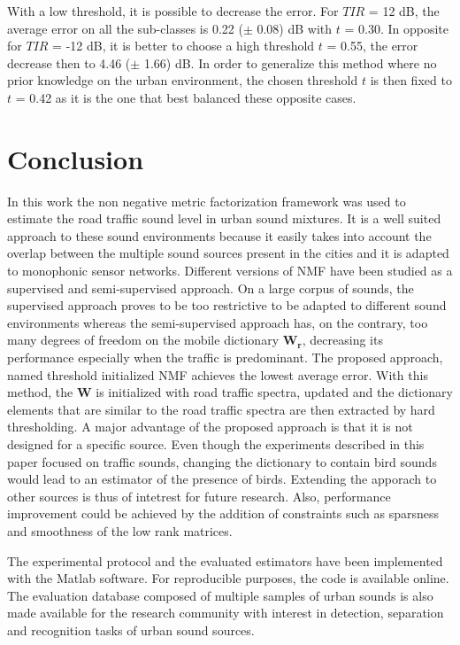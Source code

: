 \documentclass[twocolumn]{svjour3}          %
\begin{document}
With a low threshold, it is possible to decrease the error. For $TIR$ = 12 dB, the average error on all the sub-classes is 0.22 ($\pm$ 0.08) dB with $t$ = 0.30. In opposite for $TIR$ = -12 dB, it is better to choose a high threshold $t$ = 0.55, the error decrease then to 4.46 ($\pm$ 1.66) dB. In order to generalize this method where no prior knowledge on the urban environment, the chosen threshold $t$ is then fixed to $t$ = 0.42 as it is the one that best balanced these opposite cases.

\section{Conclusion}

In this work the non negative metric factorization framework  was used to estimate the road traffic sound level in urban sound mixtures. It is a well suited approach to these sound environments because it easily takes into account the overlap between the multiple sound sources present in the cities and it is adapted to monophonic sensor networks. Different versions of NMF have been studied as a supervised and semi-supervised approach. On a large corpus of sounds, the supervised approach proves to be too restrictive to be adapted to different sound environments whereas the semi-supervised approach has, on the contrary, too many degrees of freedom on the mobile dictionary $\mathbf{W_r}$, decreasing its performance especially when the traffic is predominant. The proposed approach, named threshold initialized NMF achieves the lowest average error. With this method, the $\mathbf{W}$ is initialized with road traffic spectra, updated and the dictionary elements that are similar to the road traffic spectra are then extracted by hard thresholding.
A major advantage of the proposed approach is that it is not designed for a specific source. Even though the experiments described in this paper focused on traffic sounds, changing the dictionary to contain bird sounds would lead to an estimator of the presence of birds. Extending the apporach to other sources is thus of intetrest for future research. Also, performance improvement could be achieved by the addition of constraints such as sparsness \cite{hoyer2004non} and smoothness \cite{virtanen_monaural_2007} of the low rank matrices.

The experimental protocol and the evaluated estimators have been implemented with the Matlab software. For reproducible purposes, the code is available online. The evaluation database composed of multiple samples of urban sounds is also made available for the research community with interest in detection, separation and recognition tasks of urban sound sources.
\end{document}
